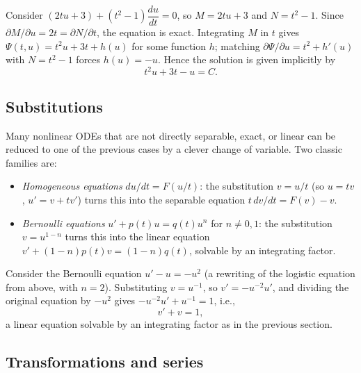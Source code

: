 \begin{example}
    Consider $(2tu + 3) + (t^2-1) \dfrac{du}{dt} = 0$, so $M = 2tu+3$
    and $N = t^2-1$. Since $\partial M/\partial u = 2t = \partial
    N/\partial t$, the equation is exact. Integrating $M$ in $t$ gives
    $\Psi(t,u) = t^2 u + 3t + h(u)$ for some function $h$; matching
    $\partial \Psi/\partial u = t^2 + h'(u)$ with $N = t^2-1$ forces
    $h(u) = -u$. Hence the solution is given implicitly by
    \begin{equation*}
        t^2 u + 3t - u = C.
    \end{equation*}
\end{example}

\subsection{Substitutions}

Many nonlinear ODEs that are not directly separable, exact, or linear
can be reduced to one of the previous cases by a clever change of
variable. Two classic families are:
\begin{itemize}
    \item \emph{Homogeneous equations} $du/dt = F(u/t)$: the
    substitution $v = u/t$ (so $u = tv$, $u' = v + tv'$) turns this
    into the separable equation $t \, dv/dt = F(v) - v$.
    \item \emph{Bernoulli equations} $u' + p(t) u = q(t) u^n$ for $n
    \neq 0,1$: the substitution $v = u^{1-n}$ turns this into the
    linear equation $v' + (1-n)p(t) v = (1-n) q(t)$, solvable by an
    integrating factor.
\end{itemize}

\begin{example}
    Consider the Bernoulli equation $u' - u = -u^2$ (a rewriting of the
    logistic equation from above, with $n=2$). Substituting $v =
    u^{-1}$, so $v' = -u^{-2} u'$, and dividing the original equation
    by $-u^2$ gives $-u^{-2}u' + u^{-1} = 1$, i.e.,
    \begin{equation*}
        v' + v = 1,
    \end{equation*}
    a linear equation solvable by an integrating factor as in the
    previous section.
\end{example}

\subsection{Transformations and series}


